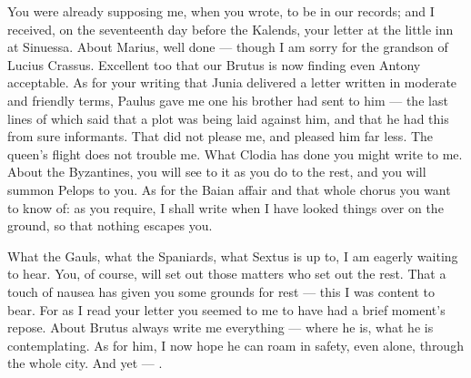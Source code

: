 

 You were already supposing me, when you wrote, to be in our records; and I received, on the seventeenth day before the Kalends, your letter at the little inn at Sinuessa. About Marius, well done --- though I am sorry for the grandson of Lucius Crassus. Excellent too that our Brutus is now finding even Antony acceptable. As for your writing that Junia delivered a letter written in moderate and friendly terms, Paulus gave me one his brother had sent to him --- the last lines of which said that a plot was being laid against him, and that he had this from sure informants. That did not please me, and pleased him far less. The queen's flight does not trouble me. What Clodia has done you might write to me. About the Byzantines, you will see to it as you do to the rest, and you will summon Pelops to you. As for the Baian affair and that whole chorus you want to know of: as you require, I shall write when I have looked things over on the ground, so that nothing escapes you.

 What the Gauls, what the Spaniards, what Sextus is up to, I am eagerly waiting to hear. You, of course, will set out those matters who set out the rest. That a touch of nausea has given you some grounds for rest --- this I was content to bear. For as I read your letter you seemed to me to have had a brief moment's repose. About Brutus always write me everything --- where he is, what he is contemplating. As for him, I now hope he can roam in safety, even alone, through the whole city. And yet --- .
